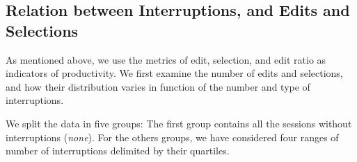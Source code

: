 \documentclass[times]{smrauth}
\begin{document}






\subsection{Relation between Interruptions, and Edits and Selections}

As mentioned above, we use the metrics of edit, selection, and edit ratio as indicators of productivity. We first examine the number of edits and selections, and how their distribution varies in function of the number and type of interruptions.

We split the data in five groups: The first group contains all the sessions without interruptions (\textit{none}). For the others groups, we have considered four ranges of number of interruptions delimited by their quartiles. 
\end{document}
